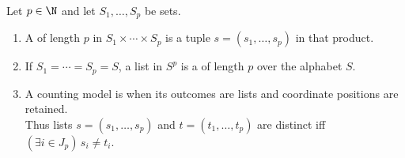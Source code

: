 \begin{definition} \label{def:lists-words-and-product-sets} \\
Let $p\in\N$ and let $S_1,\ldots,S_p$ be sets.
\begin{enumerate}[label=(\roman*)]
\setlength{\itemsep}{0pt}
\item A  of length $p$ in $S_1\times\cdots\times S_p$ is a tuple $s=(s_1,\ldots,s_p)$ in that product.
\item If $S_1=\cdots=S_p=S$, a list in $S^p$ is a  of length $p$ over the alphabet $S$.
\item A counting model is  when its outcomes are lists and coordinate positions are retained.\\
Thus lists $s=(s_1,\ldots,s_p)$ and $t=(t_1,\ldots,t_p)$ are distinct iff $(\exists i\in J_p)\,s_i\neq t_i$.
\end{enumerate}
\end{definition}

